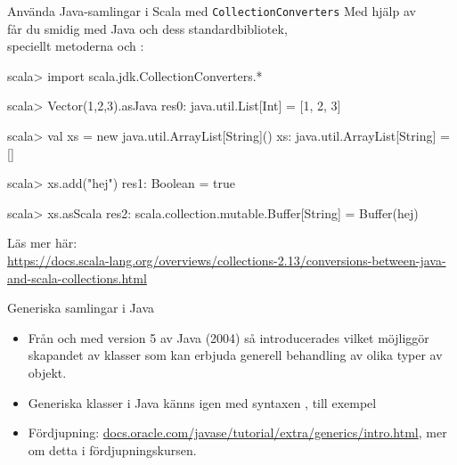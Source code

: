 
\begin{Slide}{Använda Java-samlingar i Scala med \texttt{CollectionConverters}}\SlideFontSmall
Med hjälp av  \\
får du smidig  med Java och dess standardbibliotek, \\
speciellt metoderna  och :
\begin{REPL}
scala> import scala.jdk.CollectionConverters.*

scala> Vector(1,2,3).asJava
res0: java.util.List[Int] = [1, 2, 3]

scala> val xs = new java.util.ArrayList[String]()
xs: java.util.ArrayList[String] = []

scala> xs.add("hej")
res1: Boolean = true

scala> xs.asScala
res2: scala.collection.mutable.Buffer[String] = Buffer(hej)
\end{REPL}

\noindent Läs mer här: %
\ifkompendium\\\fi%
\scriptsize%
\url{https://docs.scala-lang.org/overviews/collections-2.13/conversions-between-java-and-scala-collections.html}

\end{Slide}





\begin{Slide}{Generiska samlingar i Java}
\begin{itemize}
\item Från och med version 5 av Java (2004) så introducerades  vilket möjliggör skapandet av klasser som kan erbjuda generell behandling av olika typer av objekt.

\item Generiska klasser i Java känns igen med syntaxen , till exempel  

\item Fördjupning: \href{https://docs.oracle.com/javase/tutorial/extra/generics/intro.html}{docs.oracle.com/javase/tutorial/extra/generics/intro.html}, mer om detta i fördjupningskursen.

\end{itemize}
\end{Slide}

